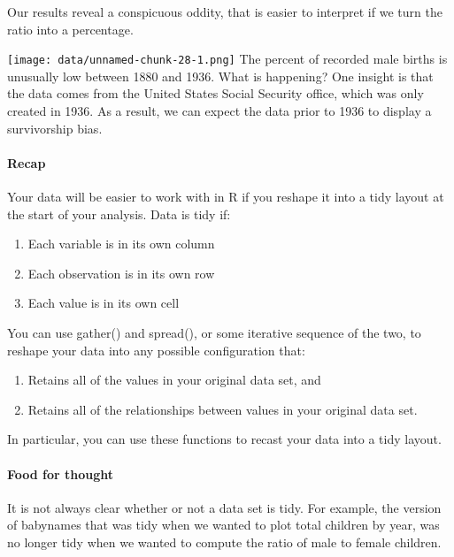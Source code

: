 \documentclass[
]{article}
\providecommand{\tightlist}{%
  \setlength{\itemsep}{0pt}\setlength{\parskip}{0pt}}
\begin{document}
Our results reveal a conspicuous oddity, that is easier to interpret if
we turn the ratio into a percentage.

\texttt{[image: data/unnamed-chunk-28-1.png]} The percent of recorded
male births is unusually low between 1880 and 1936. What is happening?
One insight is that the data comes from the United States Social
Security office, which was only created in 1936. As a result, we can
expect the data prior to 1936 to display a survivorship bias.

\hypertarget{recap-10}{%
\paragraph{Recap}\label{recap-10}}

Your data will be easier to work with in R if you reshape it into a tidy
layout at the start of your analysis. Data is tidy if:

\begin{enumerate}
\def\labelenumi{\arabic{enumi}.}
\tightlist
\item
  Each variable is in its own column
\item
  Each observation is in its own row
\item
  Each value is in its own cell
\end{enumerate}

You can use gather() and spread(), or some iterative sequence of the
two, to reshape your data into any possible configuration that:

\begin{enumerate}
\def\labelenumi{\arabic{enumi}.}
\tightlist
\item
  Retains all of the values in your original data set, and
\item
  Retains all of the relationships between values in your original data
  set.
\end{enumerate}

In particular, you can use these functions to recast your data into a
tidy layout.

\hypertarget{food-for-thought}{%
\paragraph{Food for thought}\label{food-for-thought}}

It is not always clear whether or not a data set is tidy. For example,
the version of babynames that was tidy when we wanted to plot total
children by year, was no longer tidy when we wanted to compute the ratio
of male to female children.
\end{document}
